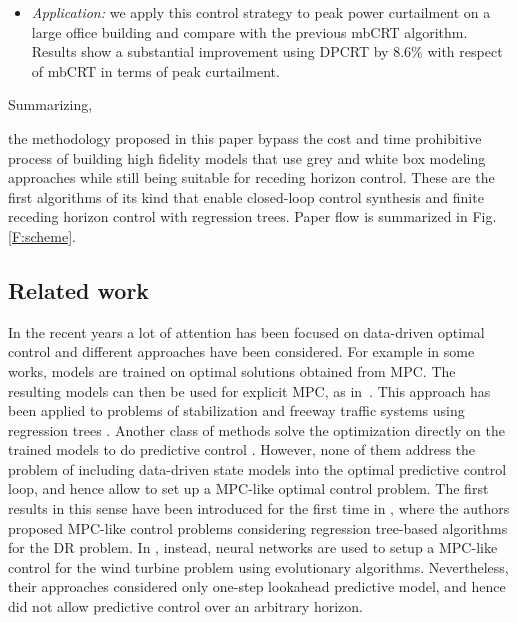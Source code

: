 {\begin{itemize}[leftmargin=1cm]
	\item \emph{Application:} we apply this control strategy to peak power curtailment on a large office building and compare with the previous mbCRT algorithm. Results show a substantial improvement using DPCRT by $8.6\%$ with respect of mbCRT in terms of peak curtailment.\\
\end{itemize}
Summarizing,} the methodology proposed in this paper bypass the cost and time prohibitive process of building high fidelity models that use grey and white box modeling approaches while still being suitable for receding horizon control. These are the first algorithms of its kind that enable closed-loop control synthesis and finite receding horizon control with regression trees. \textcolor[rgb]{0.00,0.00,1.00}{Paper flow is summarized in Fig. \ref{F:scheme}.}

\subsection{Related work}
\label{sec:related}
\textcolor[rgb]{0.00,0.00,1.00}{In the recent years a lot of attention has been focused on data-driven optimal control and different approaches have been considered.} For example in some works, models are trained on optimal solutions obtained from MPC. The resulting models can then be used for explicit MPC, as in~\cite{BemporadMorariDuaEtAl2002}. This approach has been applied to problems of  stabilization \cite{CavagnariMagniScattolini1999} and freeway traffic systems using regression trees \cite{OleariFrejoCamachoEtAl2015}. 
Another class of methods solve the optimization directly on the trained models to do predictive control \textcolor[rgb]{0.00,0.00,1.00}{ \cite{Hou2013,Costanzo2016,FerreiraRuanoSilvaEtAl2012}. However, none of them address the problem of including data-driven state models into the optimal predictive control loop, and hence allow to set up a MPC-like optimal control problem. The first results in this sense have been introduced for the first time in \cite{Behl201630}, where the authors proposed MPC-like control problems considering regression tree-based algorithms for the DR problem. In \cite{KusiakSongZheng2009}, instead, neural networks are used to setup a MPC-like control for the wind turbine problem using evolutionary algorithms. Nevertheless, their approaches considered only one-step lookahead predictive model, and hence did not allow predictive control over an arbitrary horizon.}

